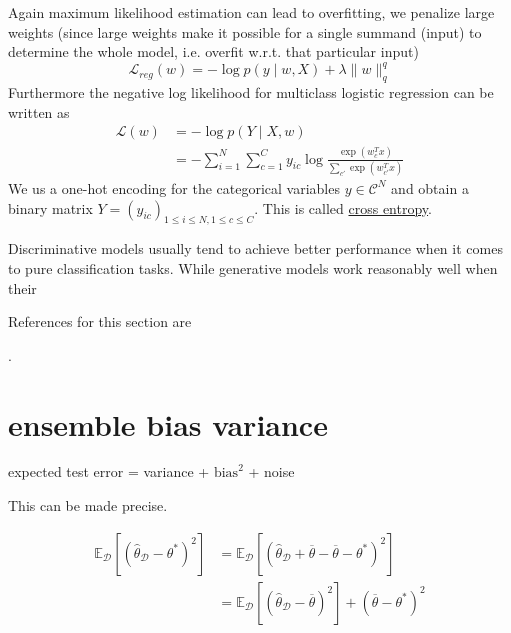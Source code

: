 \documentclass[12 pt]{article}        	%
\begin{document}
Again maximum likelihood estimation can lead to overfitting, we penalize large weights (since large weights make it possible for a single summand (input) to determine the whole model, i.e. overfit w.r.t. that particular input)
\[
    \mathcal{ L }_{ reg } ( w ) = - \log p ( y \mid w , X ) + \lambda \lVert w \rVert^q_q
\]
Furthermore the negative log likelihood for multiclass logistic regression can be written as
\begin{align*}
    \mathcal{ L } ( w ) 
    &=
    - \log p ( Y \mid X , w ) 
    \\
    &=
    - \sum_{ i = 1 }^N \sum_{ c = 1 }^C y_{ ic } \log \frac{ \exp ( w_c^T x ) }{ \sum_{ c' } \exp ( w_{c'}^T x ) }
\end{align*}
We us a one-hot encoding for the categorical variables $ y \in \mathcal{ C }^N $ and obtain a binary matrix $ Y = ( y_{ ic } )_{ 1 \leq i \leq N , 1 \leq c \leq C }$.
This is called \underline{cross entropy}.

Discriminative models usually tend to achieve better performance when it comes
to pure classification tasks.
While generative models work reasonably well when their

References for this section are
\begin{center}
    \cite[ch. 4.1.1, 4.1.2, 4.1.7, 4.2, 4.3.0 - 4.3.4]{Pattern_recognition_machine_learning}
    \cite[ch.9, 10.1-10.3]{ML_aPP}.
\end{center}

\section{ensemble bias variance}

\begin{center}
    expected test error = variance + $ \text{bias}^2 $ + noise
\end{center}

This can be made precise.

\begin{align*}
    \mathbb{ E }_{ \mathcal{ D } } [ ( \hat{ \theta }_{ \mathcal{ D } } - \theta^* )^2 ] 
    &=
    \mathbb{ E }_{ \mathcal{ D } }[ ( \hat{ \theta }_{ \mathcal{ D } } + \overline{ \theta } - \overline{ \theta } - \theta^* )^2 ]
    \\
    &=
    \mathbb{ E }_{ \mathcal{ D } } [ ( \hat{ \theta }_{ \mathcal{ D } } - \overline{ \theta } )^2 ] + ( \overline{ \theta } - \theta^* )^2 
\end{align*}
\end{document}
